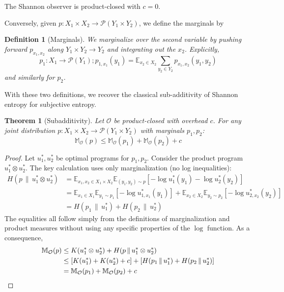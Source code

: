 \documentclass[11pt]{article}
\newtheorem{definition}{Definition}
\newtheorem{theorem}{Theorem}
\begin{document}
The Shannon observer is product-closed with $c = 0$.

Conversely, given $p: X_1\times X_2 \to \mathcal P(Y_1\times Y_2)$, we define the marginals by
\begin{definition}[Marginals]
    We marginalize over the second variable by pushing forward $p_{x_1,x_2}$ along $Y_1\times Y_2 \to Y_2$ and integrating out the $x_2$. Explicitly,
    \[p_1: X_1 \to \mathcal P(Y_1); p_{1,x_1}(y_1) = \mathbb E_{x_2 \in X_2}\sum_{y_2 \in Y_2}p_{x_1,x_2}(y_1,y_2)\]
    and similarly for $p_2$.
\end{definition}

With these two definitions, we recover the classical sub-additivity of Shannon entropy for subjective entropy.

\begin{theorem}[Subadditivity]\label{thm:subadditive}
Let $\mathcal{O}$ be product-closed with overhead $c$. For any joint distribution $p: X_1\times X_2 \to \mathcal P(Y_1 \times Y_2)$ with marginals $p_1, p_2$:
\begin{equation}
\mathbb{M}_{\mathcal{O}}(p) \leq \mathbb{M}_{\mathcal{O}}(p_1) + \mathbb{M}_{\mathcal{O}}(p_2) + c
\end{equation}
\end{theorem}

\begin{proof}
Let $u^*_1, u^*_2$ be optimal programs for $p_1, p_2$. Consider the product program $u^*_1 \otimes u^*_2$.
The key calculation uses only marginalization (no log inequalities):
\begin{align}
H(p \,\|\, u^*_1 \otimes u^*_2)
&= \mathbb E_{x_1,x_2 \in X_1\times X_2}\mathbb{E}_{(y_1,y_2) \sim p}[-\log u^*_1(y_1) - \log u^*_2(y_2)] \\
&= \mathbb E_{x_1 \in X_1}\mathbb{E}_{y_1 \sim p_1}[-\log u^*_{1,x_1}(y_1)] + \mathbb E_{x_2 \in X_2}\mathbb{E}_{y_2 \sim p_2}[-\log u^*_{2,x_2}(y_2)] \\
&= H(p_1 \,\|\, u^*_1) + H(p_2 \,\|\, u^*_2)
\end{align}
The equalities all follow simply from the definitions of marginalization and product measures without using any specific properties of the $\log$ function. As a consequence,
\begin{align}
\mathbb{M}_{\mathcal{O}}(p)
&\leq K(u^*_1 \otimes u^*_2) + H(p \,\|\, u^*_1 \otimes u^*_2) \\
&\leq [K(u^*_1) + K(u^*_2) + c] + [H(p_1 \,\|\, u^*_1) + H(p_2 \,\|\, u^*_2)] \\
&= \mathbb{M}_{\mathcal{O}}(p_1) + \mathbb{M}_{\mathcal{O}}(p_2) + c \qedhere
\end{align}
\end{proof}
\end{document}
